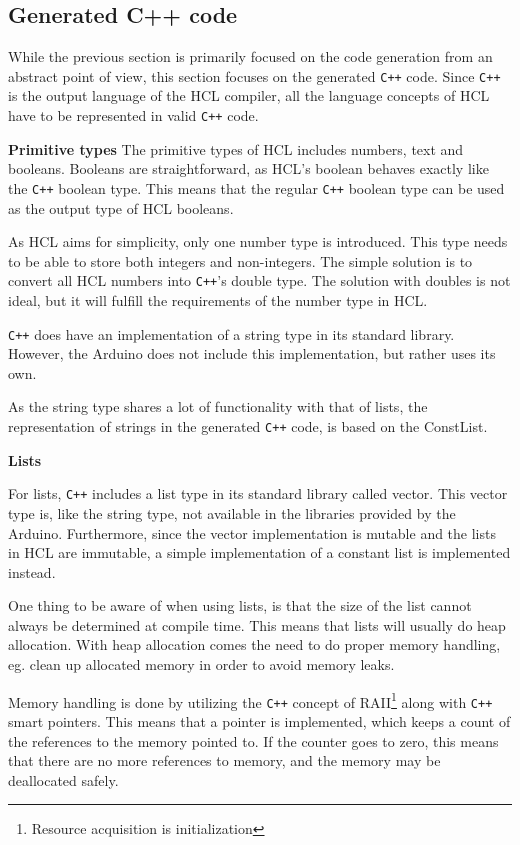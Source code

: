 
\subsection{Generated C++ code}
\label{sec:gencplusplus}
While the previous section is primarily focused on the code generation from an abstract point of view, this section focuses on the generated \texttt{C++} code.
Since \texttt{C++} is the output language of the HCL compiler, all the language concepts of HCL have to be represented in valid \texttt{C++} code.

\textbf{Primitive types}
The primitive types of HCL includes numbers, text and booleans. 
Booleans are straightforward, as HCL's boolean behaves exactly like the \texttt{C++} boolean type.
This means that the regular \texttt{C++} boolean type can be used as the output type of HCL booleans.

As HCL aims for simplicity, only one number type is introduced. 
This type needs to be able to store both integers and non-integers. 
The simple solution is to convert all HCL numbers into \texttt{C++}'s double type.
The solution with doubles is not ideal, but it will fulfill the requirements of the number type in HCL.

\texttt{C++} does have an implementation of a string type in its standard library.
However, the Arduino does not include this implementation, but rather uses its own.

As the string type shares a lot of functionality with that of lists, the representation of strings in the generated \texttt{C++} code, is based on the ConstList.

\textbf{Lists}

For lists, \texttt{C++} includes a list type in its standard library called vector. 
This vector type is, like the string type, not available in the libraries provided by the Arduino.
Furthermore, since the vector implementation is mutable and the lists in HCL are immutable, a simple implementation of a constant list is implemented instead.

One thing to be aware of when using lists, is that the size of the list cannot always be determined at compile time.
This means that lists will usually do heap allocation. 
With heap allocation comes the need to do proper memory handling, eg.
clean up allocated memory in order to avoid memory leaks.

Memory handling is done by utilizing the \texttt{C++} concept of RAII\footnote{Resource acquisition is initialization} along with \texttt{C++} smart pointers.
This means that a pointer is implemented, which keeps a count of the references to the memory pointed to.
If the counter goes to zero, this means that there are no more references to memory, and the memory may be deallocated safely.


